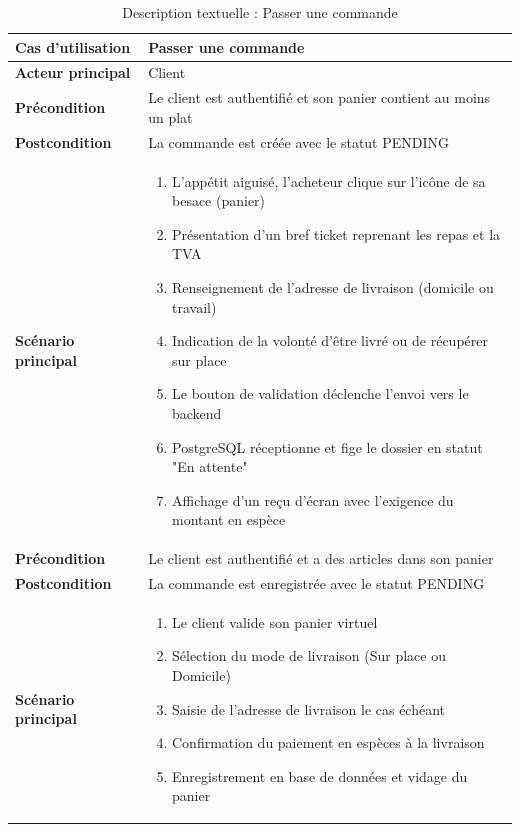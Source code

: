 \begin{table}[H]
    \centering
    \caption{Description textuelle : Passer une commande}
    \label{tab:desc_passer_commande}
    \renewcommand{\arraystretch}{1.3}
    \begin{tabular}{|p{4cm}|p{8.5cm}|}
        \hline
        \textbf{Cas d'utilisation} & Passer une commande \\
        \hline
        \textbf{Acteur principal} & Client \\
        \hline
        \textbf{Précondition} & Le client est authentifié et son panier contient au moins un plat \\
        \hline
        \textbf{Postcondition} & La commande est créée avec le statut PENDING \\
        \hline
        \textbf{Scénario principal} &
        \begin{enumerate}
            \item L'appétit aiguisé, l'acheteur clique sur l'icône de sa besace (panier)
            \item Présentation d'un bref ticket reprenant les repas et la TVA
            \item Renseignement de l'adresse de livraison (domicile ou travail)
            \item Indication de la volonté d'être livré ou de récupérer sur place
            \item Le bouton de validation déclenche l'envoi vers le backend
            \item PostgreSQL réceptionne et fige le dossier en statut "En attente"
            \item Affichage d'un reçu d'écran avec l'exigence du montant en espèce
        \end{enumerate} \\
        \hline
        \textbf{Précondition} & Le client est authentifié et a des articles dans son panier \\
        \hline
        \textbf{Postcondition} & La commande est enregistrée avec le statut PENDING \\
        \hline
        \textbf{Scénario principal} &
        \begin{enumerate}
            \item Le client valide son panier virtuel
            \item Sélection du mode de livraison (Sur place ou Domicile)
            \item Saisie de l'adresse de livraison le cas échéant
            \item Confirmation du paiement en espèces à la livraison
            \item Enregistrement en base de données et vidage du panier
        \end{enumerate} \\
        \hline
    \end{tabular}
\end{table}

